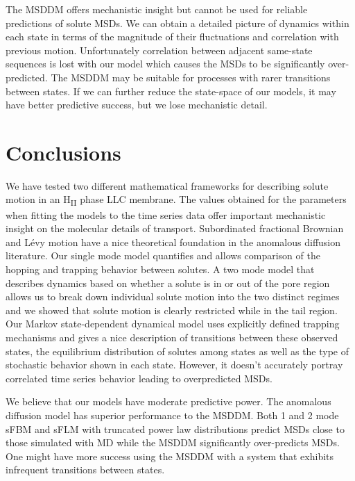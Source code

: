 \documentclass{article}
\begin{document}
  The MSDDM offers mechanistic insight but cannot be used for reliable predictions
  of solute MSDs. We can obtain a detailed picture of dynamics within each state in
  terms of the magnitude of their fluctuations and correlation with previous 
  motion. Unfortunately correlation between adjacent same-state sequences is lost
  with our model which causes the MSDs to be significantly over-predicted. The MSDDM
  may be suitable for processes with rarer transitions between states. If we can 
  further reduce the state-space of our models, it may have better predictive success,
  but we lose mechanistic detail.
  

  \section{Conclusions}
  
  
  We have tested two different mathematical frameworks for describing solute
  motion in an H\textsubscript{II} phase LLC membrane. The values obtained for
  the parameters when fitting the models to the time series data offer important
  mechanistic insight on the molecular details of transport.
  Subordinated fractional Brownian and L\'evy motion have a nice theoretical 
  foundation in the anomalous diffusion literature. Our single mode model
  quantifies and allows comparison of the hopping and trapping behavior 
  between solutes. A two mode model that describes dynamics based on whether
  a solute is in or out of the pore region allows us to break down individual
  solute motion into the two distinct regimes and we showed that solute motion is
  clearly restricted while in the tail region. Our Markov state-dependent dynamical
  model uses explicitly defined trapping mechanisms and gives a nice description 
  of transitions between these observed states, the equilibrium distribution of 
  solutes among states as well as the type of stochastic behavior shown in each 
  state. However, it doesn't accurately portray correlated time series behavior
  leading to overpredicted MSDs.
  
  We believe that our models have moderate predictive power. 
  The anomalous
  diffusion model has superior performance to the MSDDM. Both 1 and 2 mode 
  sFBM and sFLM with truncated power law distributions predict MSDs close 
  to those simulated with MD while the MSDDM significantly over-predicts MSDs.
  One might have more success using the MSDDM with a system that exhibits
  infrequent transitions between states.
\end{document}
